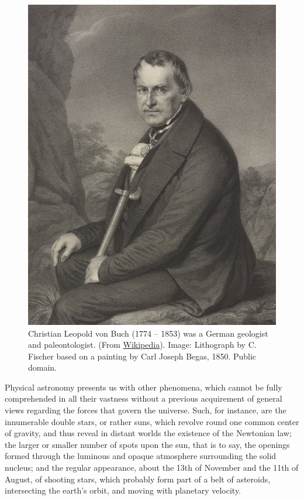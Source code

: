 \clearpage
\begin{figure}
   \begin{center}
      \vspace{-0.5cm}
      \begin{center}
         \includegraphics[width=.5\textwidth]{../../pictures/Leopold_von_Buch_btv1b105009064_(cropped).jpg}
      \end{center}
      \caption{
         {
            \small Christian Leopold von Buch (1774 -- 1853) was a German
               geologist and paleontologist. (From
               \href{https://en.wikipedia.org/wiki/Christian_Leopold_von_Buch}{Wikipedia}). Image: Lithograph by C.
               Fischer based on a painting by Carl Joseph Begas, 1850. Public domain.
         }
      }
      \vspace{-1.3cm}
   \end{center}
\end{figure}

Physical astronomy presents us with other phenomena, which cannot be fully comprehended in all their vastness without a previous acquirement of general views regarding the forces that govern the universe. Such, for instance, are the innumerable double stars, or rather suns, which revolve round one common center of gravity, and thus reveal in distant worlds the existence of the Newtonian law; the larger or smaller number of spots upon the sun, that is to say, the openings formed through the luminous and opaque atmosphere surrounding the solid nucleus; and the regular appearance, about the 13th of November and the 11th of August, of shooting stars, which probably form part of a belt of asteroids, intersecting the earth's orbit, and moving with planetary velocity.

